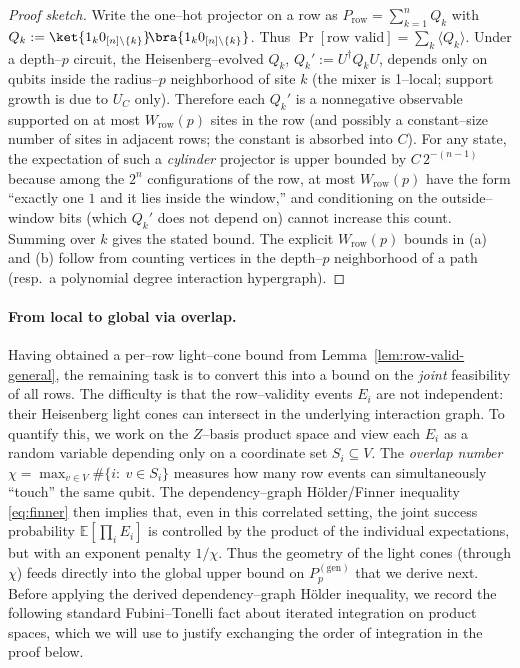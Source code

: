 \documentclass[a4paper,onecolumn,11pt,unpublished]{quantumarticle}
\theoremstyle{remark}
\begin{document}
\begin{proof}[Proof sketch]
Write the one–hot projector on a row as
$P_{\mathrm{row}}=\sum_{k=1}^{n} Q_{k}$ with
$Q_{k}:=\ket{1_k 0_{[n]\setminus\{k\}}}\!\bra{1_k 0_{[n]\setminus\{k\}}}$.
Thus $\Pr[\text{row valid}]=\sum_k \langle Q_k\rangle$.
Under a depth–$p$ circuit, the Heisenberg–evolved $Q_k$,
$Q_k' := U^\dagger Q_k U$, depends only on qubits inside the radius–$p$
neighborhood of site $k$ (the mixer is 1–local; support growth is due to
$U_C$ only). Therefore each $Q_k'$ is a nonnegative observable supported on at
most $W_{\mathrm{row}}(p)$ sites in the row (and possibly a constant–size
number of sites in adjacent rows; the constant is absorbed into $C$).
For any state, the expectation of such a \emph{cylinder} projector is upper
bounded by $C\,2^{-(n-1)}$ because among the $2^n$ configurations of the row,
at most $W_{\mathrm{row}}(p)$ have the form “exactly one $1$ and it lies inside
the window,” and conditioning on the outside–window bits (which $Q_k'$ does not
depend on) cannot increase this count. Summing over $k$ gives the stated bound.
The explicit $W_{\mathrm{row}}(p)$ bounds in (a) and (b) follow from counting
vertices in the depth–$p$ neighborhood of a path (resp.\ a polynomial degree interaction hypergraph).
\end{proof}



\paragraph{From local to global via overlap.}
Having obtained a per–row light–cone bound from
Lemma~\ref{lem:row-valid-general}, the remaining task is to convert this
into a bound on the \emph{joint} feasibility of all rows. The difficulty
is that the row–validity events $E_i$ are not independent: their
Heisenberg light cones can intersect in the underlying interaction graph.
To quantify this, we work on the $Z$–basis product space and view each
$E_i$ as a random variable depending only on a coordinate set
$S_i\subseteq V$. The \emph{overlap number}
$\chi=\max_{v\in V}\#\{i:\ v\in S_i\}$ measures how many row events can
simultaneously ``touch'' the same qubit. The dependency–graph
Hölder/Finner inequality \eqref{eq:finner} then implies that, even in
this correlated setting, the joint success probability
$\mathbb{E}[\prod_i E_i]$ is controlled by the product of the individual
expectations, but with an exponent penalty $1/\chi$. Thus the geometry
of the light cones (through $\chi$) feeds directly into the global upper
bound on $P_p^{\mathrm{(gen)}}$ that we derive next. Before applying the derived dependency–graph Hölder inequality, we record the following standard Fubini–Tonelli fact about iterated integration on product spaces, which we will use to justify exchanging the order of integration in the proof below.
\end{document}
